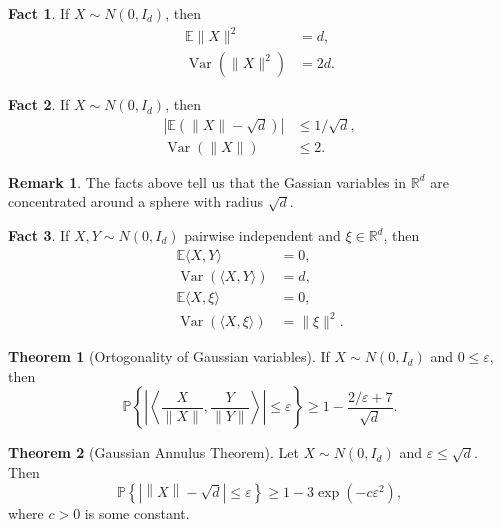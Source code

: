 \documentclass{article}
\theoremstyle{definition}
\newtheorem{theorem}{Theorem}[section]
\newtheorem{fact}{Fact}[section]
\newtheorem{remark}{Remark}[section]
\begin{document}
  \begin{fact}
    If \( X \sim N(0, I_d) \), then
    \[
      \begin{aligned}
        \mathbb{E} \|X\|^{2} &= d, \\
        \operatorname{Var}(\|X\|^2) &= 2d.
      \end{aligned}
    \]
  \end{fact}

  \begin{fact}
    If \( X \sim N(0, I_d) \), then
    \[
      \begin{aligned}
        \left| \mathbb{E}\left( \|X\| - \sqrt{d} \right) \right|
        &\leq 1/\sqrt{d}, \\
        \operatorname{Var}(\|X\|) &\leq 2.
      \end{aligned}
    \]
  \end{fact}

  \begin{remark}
    The facts above tell us that the Gassian variables in \(
    \mathbb{R}^d \) are concentrated around a sphere with radius \(
    \sqrt{d} \).
  \end{remark}

  \begin{fact}
    If \( X, Y \sim N(0, I_d) \) pairwise independent and \( \xi \in
    \mathbb{R}^d \), then
    \[
      \begin{align}
        \mathbb{E}\langle X, Y \rangle &= 0, \\
        \operatorname{Var}(\langle X, Y \rangle) &= d, \\
        \mathbb{E}\langle X, \xi \rangle &= 0, \\
        \operatorname{Var}(\langle X, \xi \rangle) &= \|\xi\|^{2}.
      \end{align}
    \]
  \end{fact}

  \begin{theorem}[Ortogonality of Gaussian variables]
    If \( X \sim N(0, I_d) \) and \( 0 \leq \varepsilon \), then
    \[
      \mathbb{P}\left\{ \left| \left\langle \frac{X}{\|X\|}, \frac{Y}{\|Y\|}
      \right\rangle \right| \leq \varepsilon \right\} \geq 1 - \frac{2 /
      \varepsilon + 7}{\sqrt{d}}.
    \]
  \end{theorem}

  \begin{theorem}[Gaussian Annulus Theorem]
    Let \( X \sim N(0, I_d) \) and \( \varepsilon \leq \sqrt{d} \). Then
    \[
      \mathbb{P}\left\{ \left| \left\|X\right\| - \sqrt{d} \right| \leq
      \varepsilon \right\} \geq 1 - 3 \exp\left( -c \varepsilon^2\right),
    \]
    where \( c > 0 \) is some constant.
  \end{theorem}
\end{document}
